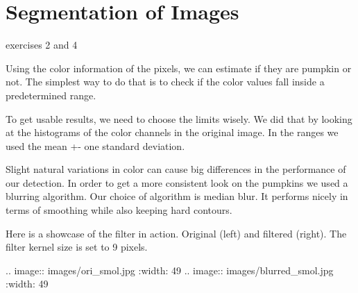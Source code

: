 \documentclass[../Head/Main.tex]{subfiles}
\begin{document}
\section{Segmentation of Images}
exercises 2 and 4

Using the color information of the pixels, we can estimate if they are pumpkin or not.
The simplest way to do that is to check if the color values fall inside a predetermined range.

To get usable results, we need to choose the limits wisely.
We did that by looking at the histograms of the color channels in the original image.
In the ranges we used the mean +- one standard deviation.

Slight natural variations in color can cause big differences in the performance of our detection.
In order to get a more consistent look on the pumpkins we used a blurring algorithm.
Our choice of algorithm is median blur. It performs nicely in terms of smoothing while also keeping hard contours.

Here is a showcase of the filter in action. Original (left) and filtered (right). The filter kernel size is set to 9 pixels.

.. image:: images/ori_smol.jpg
    :width: 49 %
.. image:: images/blurred_smol.jpg
    :width: 49 %
\end{document}
